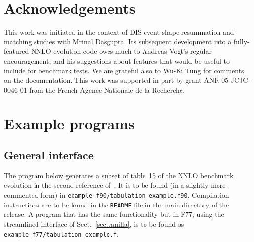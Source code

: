 \documentclass[12pt]{article}
\newcommand{\ttt}[1]{\texttt{#1}}
\begin{document}
\section*{Acknowledgements}

This work was initiated in the context of DIS event shape resummation
and matching studies \cite{DisResum} with Mrinal Dasgupta. Its
subsequent development into a fully-featured NNLO evolution code owes
much to Andreas Vogt's regular encouragement, and his suggestions
about features that would be useful to include for benchmark tests.
We are grateful also to Wu-Ki Tung for comments on the documentation.
%
This work was supported in part by grant ANR-05-JCJC-0046-01 from the
French Agence Nationale de la Recherche. 

\appendix


\section{Example programs}
\label{sec:example_program}

\subsection{General interface}

The program below generates a subset of table~15 of the NNLO benchmark
evolution in the second reference of~\cite{Benchmarks}. It is to be
found (in a slightly more commented form) in
\ttt{example\_f90/tabulation\_example.f90}. Compilation instructions
are to be found in the \ttt{README} file in the main directory of the
release. A program that has the same functionality but in F77, using
the streamlined interface of Sect.~\ref{sec:vanilla}, is to be found as
\ttt{example\_f77/tabulation\_example.f}.
\end{document}
